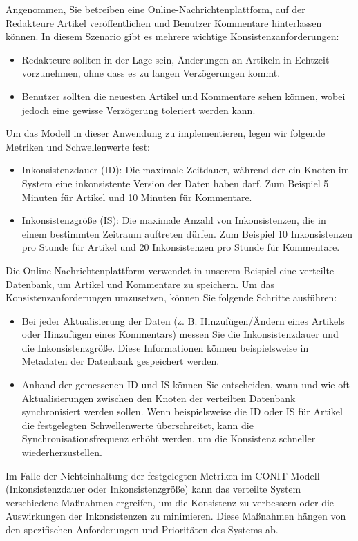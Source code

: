 Angenommen, Sie betreiben eine Online-Nachrichtenplattform, auf der Redakteure Artikel veröffentlichen und Benutzer Kommentare hinterlassen können. In diesem Szenario gibt es mehrere wichtige Konsistenzanforderungen:
\begin{itemize}
\item Redakteure sollten in der Lage sein, Änderungen an Artikeln in Echtzeit vorzunehmen, ohne dass es zu langen Verzögerungen kommt.
\item Benutzer sollten die neuesten Artikel und Kommentare sehen können, wobei jedoch eine gewisse Verzögerung toleriert werden kann.
\end{itemize}
Um das Modell in dieser Anwendung zu implementieren, legen wir folgende Metriken und Schwellenwerte fest:
\begin{itemize}
\item Inkonsistenzdauer (ID): Die maximale Zeitdauer, während der ein Knoten im System eine inkonsistente Version der Daten haben darf. Zum Beispiel 5 Minuten für Artikel und 10 Minuten für Kommentare.
\item Inkonsistenzgröße (IS): Die maximale Anzahl von Inkonsistenzen, die in einem bestimmten Zeitraum auftreten dürfen. Zum Beispiel 10 Inkonsistenzen pro Stunde für Artikel und 20 Inkonsistenzen pro Stunde für Kommentare.
\end{itemize}

Die Online-Nachrichtenplattform verwendet in unserem Beispiel eine verteilte Datenbank, um Artikel und Kommentare zu speichern. Um das Konsistenzanforderungen umzusetzen, können Sie folgende Schritte ausführen:
\begin{itemize}
\item Bei jeder Aktualisierung der Daten (z. B. Hinzufügen/Ändern eines Artikels oder Hinzufügen eines Kommentars) messen Sie die Inkonsistenzdauer und die Inkonsistenzgröße. Diese Informationen können beispielsweise in Metadaten der Datenbank gespeichert werden.
\item Anhand der gemessenen ID und IS können Sie entscheiden, wann und wie oft Aktualisierungen zwischen den Knoten der verteilten Datenbank synchronisiert werden sollen. Wenn beispielsweise die ID oder IS für Artikel die festgelegten Schwellenwerte überschreitet, kann die Synchronisationsfrequenz erhöht werden, um die Konsistenz schneller wiederherzustellen.
\end{itemize}

Im Falle der Nichteinhaltung der festgelegten Metriken im CONIT-Modell (Inkonsistenzdauer oder Inkonsistenzgröße) kann das verteilte System verschiedene Maßnahmen ergreifen, um die Konsistenz zu verbessern oder die Auswirkungen der Inkonsistenzen zu minimieren. Diese Maßnahmen hängen von den spezifischen Anforderungen und Prioritäten des Systems ab.


